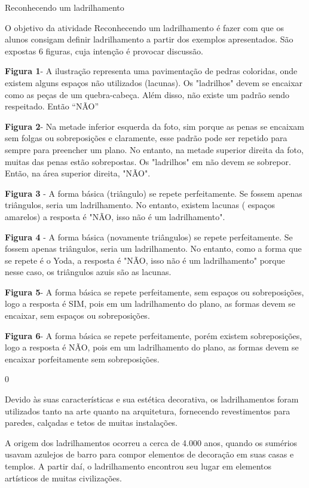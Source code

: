 \begin{answer}{Reconhecendo um ladrilhamento}
{
	O objetivo da atividade Reconhecendo um ladrilhamento é fazer com que os alunos consigam definir ladrilhamento a partir dos exemplos apresentados. São expostas 6 figuras, cuja intenção é provocar discussão.

	\textbf{Figura 1}- A ilustração representa uma pavimentação de pedras coloridas, onde existem alguns espaços não utilizados (lacunas).  Os "ladrilhos" devem se encaixar como as peças de um quebra-cabeça. Além disso, não existe um padrão sendo respeitado. Então “NÃO”

	\textbf{Figura 2}- Na metade inferior esquerda da foto, sim porque as penas se encaixam sem folgas ou sobreposições e claramente, esse padrão pode ser repetido para sempre para preencher um plano. No entanto, na metade superior direita da foto, muitas das penas estão sobrepostas. Os "ladrilhos" em não devem se sobrepor. Então, na área superior direita, "NÃO".

	\textbf{Figura 3} - A forma básica (triângulo) se repete perfeitamente. Se fossem apenas triângulos, seria um ladrilhamento. No entanto, existem lacunas ( espaços amarelos) a resposta é  "NÃO, isso não é um ladrilhamento".

	\textbf{Figura 4} - A forma básica (novamente triângulos) se repete perfeitamente. Se fossem apenas triângulos, seria um ladrilhamento. No entanto, como a forma que se repete é o Yoda, a resposta é  "NÃO, isso não é um ladrilhamento" porque nesse caso, os triângulos azuis são as lacunas.


	\textbf{Figura 5}- A forma básica se repete perfeitamente, sem espaços ou sobreposições, logo a resposta é SIM, pois em um ladrilhamento do plano, as formas devem se encaixar, sem espaços ou sobreposições.

	\textbf{Figura 6}-  A forma básica se repete perfeitamente, porém existem sobreposições, logo a resposta é NÃO, pois em um ladrilhamento do plano, as formas devem se encaixar porfeitamente sem sobreposições.
}{0}
\end{answer}


\label{ladri-exp-1}

Devido às suas características e sua estética decorativa, os ladrilhamentos foram utilizados tanto na arte quanto na arquitetura, fornecendo revestimentos para paredes, calçadas e tetos de muitas instalações. 

A origem dos ladrilhamentos ocorreu a cerca de  4.000 anos, quando os sumérios usavam azulejos de barro para compor elementos de decoração em suas casas e templos. A partir daí, o ladrilhamento encontrou seu lugar em elementos artísticos de muitas civilizações. 


